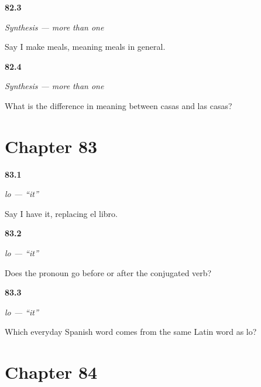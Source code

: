 \noindent\begin{minipage}[t]{\linewidth}
\raggedright
\hypertarget{review-ES-C44-sintesis-mas-de-uno-meals}{\textbf{82.3}} \emph{Synthesis — more than one}\par
\small Say I make meals, meaning meals in general.
\end{minipage}\par\medskip

\noindent\begin{minipage}[t]{\linewidth}
\raggedright
\hypertarget{review-ES-C44-sintesis-mas-de-uno-contrast}{\textbf{82.4}} \emph{Synthesis — more than one}\par
\small What is the difference in meaning between casas and las casas?
\end{minipage}\par\medskip

\section*{Chapter 83}

\noindent\begin{minipage}[t]{\linewidth}
\raggedright
\hypertarget{review-ES-C42-lo-replace}{\textbf{83.1}} \emph{lo — \textquotedblleft{}it\textquotedblright{}}\par
\small Say I have it, replacing el libro.
\end{minipage}\par\medskip

\noindent\begin{minipage}[t]{\linewidth}
\raggedright
\hypertarget{review-ES-C42-lo-place}{\textbf{83.2}} \emph{lo — \textquotedblleft{}it\textquotedblright{}}\par
\small Does the pronoun go before or after the conjugated verb?
\end{minipage}\par\medskip

\noindent\begin{minipage}[t]{\linewidth}
\raggedright
\hypertarget{review-ES-C42-lo-origin}{\textbf{83.3}} \emph{lo — \textquotedblleft{}it\textquotedblright{}}\par
\small Which everyday Spanish word comes from the same Latin word as lo?
\end{minipage}\par\medskip

\section*{Chapter 84}

